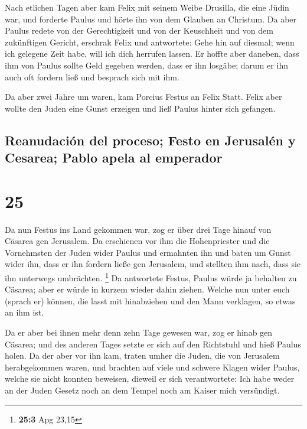  Nach etlichen Tagen aber kam Felix mit seinem Weibe
Drusilla, die eine Jüdin war, und forderte Paulus und hörte ihn von dem
Glauben an Christum.  Da aber Paulus redete von der
Gerechtigkeit und von der Keuschheit und von dem zukünftigen Gericht,
erschrak Felix und antwortete: Gehe hin auf diesmal; wenn ich gelegene
Zeit habe, will ich dich herrufen lassen.  Er hoffte aber
daneben, dass ihm von Paulus sollte Geld gegeben werden, dass er ihn
losgäbe; darum er ihn auch oft fordern ließ und besprach sich mit ihm.

 Da aber zwei Jahre um waren, kam Porcius Festus an Felix
Statt. Felix aber wollte den Juden eine Gunst erzeigen und ließ Paulus
hinter sich gefangen.

\hypertarget{reanudaciuxf3n-del-proceso-festo-en-jerusaluxe9n-y-cesarea-pablo-apela-al-emperador}{%
\subsection{Reanudación del proceso; Festo en Jerusalén y Cesarea; Pablo
apela al
emperador}\label{reanudaciuxf3n-del-proceso-festo-en-jerusaluxe9n-y-cesarea-pablo-apela-al-emperador}}

\hypertarget{section-24}{%
\section{25}\label{section-24}}

 Da nun Festus ins Land gekommen war, zog er über drei
Tage hinauf von Cäsarea gen Jerusalem.  Da erschienen vor
ihm die Hohenpriester und die Vornehmsten der Juden wider Paulus und
ermahnten ihn  und baten um Gunst wider ihn, dass er ihn
fordern ließe gen Jerusalem, und stellten ihm nach, dass sie ihn
unterwegs umbrächten. \footnote{\textbf{25:3} Apg 23,15} 
Da antwortete Festus, Paulus würde ja behalten zu Cäsarea; aber er würde
in kurzem wieder dahin ziehen.  Welche nun unter euch
(sprach er) können, die lasst mit hinabziehen und den Mann verklagen, so
etwas an ihm ist.

 Da er aber bei ihnen mehr denn zehn Tage gewesen war, zog
er hinab gen Cäsarea; und des anderen Tages setzte er sich auf den
Richtstuhl und hieß Paulus holen.  Da der aber vor ihn
kam, traten umher die Juden, die von Jerusalem herabgekommen waren, und
brachten auf viele und schwere Klagen wider Paulus, welche sie nicht
konnten beweisen,  dieweil er sich verantwortete: Ich habe
weder an der Juden Gesetz noch an dem Tempel noch am Kaiser mich
versündigt.

